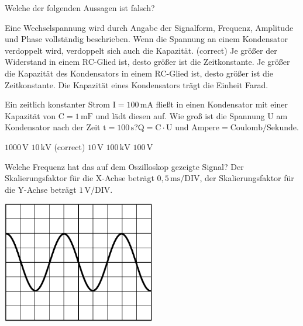 \documentclass[11pt]{exam}
\begin{document}
\setlength{\voffset}{-0.5in}
\setlength{\headsep}{5pt}

\hspace{2mm}
 \hspace{5mm}
\vspace{4mm}

\begin{questions}

\question Welche der folgenden Aussagen ist falsch?

\begin{choices}
	\choice Eine Wechselspannung wird durch Angabe der Signalform, Frequenz, Amplitude und Phase vollständig beschrieben.
	\choice Wenn die Spannung an einem Kondensator verdoppelt wird, verdoppelt sich auch die Kapazität. (correct)
	\choice Je größer der Widerstand in einem RC-Glied ist, desto größer ist die Zeitkonstante.
	\choice Je größer die Kapazität des Kondensators in einem RC-Glied ist, desto größer ist die Zeitkonstante.
	\choice Die Kapazität eines Kondensators trägt die Einheit Farad.
\end{choices}

\vspace{3mm}\question Ein zeitlich konstanter Strom \(\mathrm{I=100\,mA}\) fließt in einen Kondensator mit einer Kapazität von \(\mathrm{C=1\,mF}\) und lädt diesen auf. Wie groß ist die Spannung \(\mathrm{U}\) am Kondensator nach der Zeit \(\mathrm{t=100\,s}\)?\(\mathrm{Q=C \cdot U}\) und \(\mathrm{Ampere=Coulomb/Sekunde}\).

\begin{choices}
	\choice \(\mathrm{1000\,V}\)
	\choice \(\mathrm{10\,kV}\) (correct)
	\choice \(\mathrm{10\,V}\)
	\choice \(\mathrm{100\,kV}\)
	\choice \(\mathrm{100\,V}\)
\end{choices}

\vspace{3mm}\question Welche Frequenz hat das auf dem Oszilloskop gezeigte Signal? Der Skalierungsfaktor für die X-Achse beträgt \(\mathrm{0,5\,ms/DIV}\), der Skalierungsfaktor für die Y-Achse beträgt \(\mathrm{1\,V/DIV}\). 

\includegraphics[width=0.5\textwidth]{../../../questions/D/images/Oszi1.png}


\end{questions}
\end{document}
